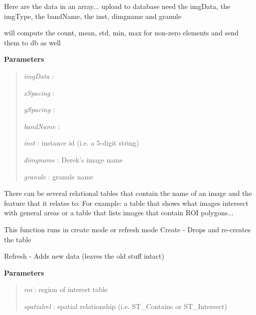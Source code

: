 \documentclass[letterpaper,10pt,english]{sphinxmanual}
\begin{document}
\begin{fulllineitems}
\begin{fulllineitems}
\end{fulllineitems}


\begin{fulllineitems}
\label{code:Database.Database.imgData2db}
Here are the data in an array... upload to database
need the imgData, the imgType, the bandName, the inst, dimgname and granule

will compute the count, mean, std, min, max for non-zero elements
and send them to db as well

\textbf{Parameters}
\begin{quote}

\emph{imgData}   :

\emph{xSpacing}  :

\emph{ySpacing}  :

\emph{bandName}  :

\emph{inst}      : instance id (i.e. a 5-digit string)

\emph{dimgname}  : Derek's image name

\emph{granule}   : granule name
\end{quote}

\end{fulllineitems}


\begin{fulllineitems}
\label{code:Database.Database.instimg2db}
There can be several relational tables that contain the name of an image
and the feature that it relates to:
For example:  a table that shows what images intersect with general areas or
a table that lists images that contain ROI polygons...

This function runs in create mode or refresh mode
Create - Drops and re-creates the table

Refresh - Adds new data (leaves the old stuff intact)

\textbf{Parameters}
\begin{quote}

\emph{roi}        : region of interest table

\emph{spatialrel} : spatial relationship (i.e. ST\_Contains or ST\_Intersect)


\end{quote}
\end{fulllineitems}
\end{fulllineitems}
\end{document}
